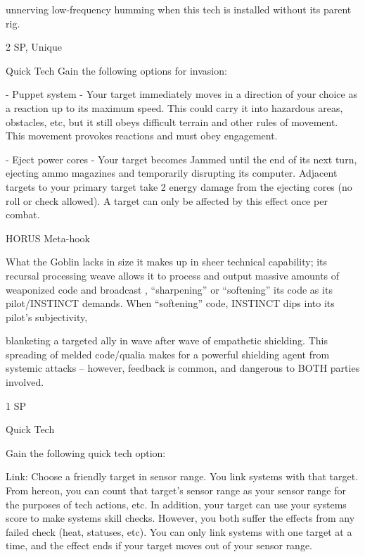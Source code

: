 unnerving low-frequency humming when this tech is installed without its parent rig.  

2 SP, Unique  

Quick Tech  
Gain the following options for invasion:
 
     -   Puppet system - Your target immediately moves in a direction of your choice as a  
         reaction up to its maximum speed. This could carry it into hazardous areas, obstacles,  
         etc, but it still obeys difficult terrain and other rules of movement. This movement  
         provokes reactions and must obey engagement.
 
     -   Eject power cores - Your target becomes Jammed until the end of its next turn, ejecting  
         ammo magazines and temporarily disrupting its computer. Adjacent targets to your  
         primary target take 2 energy damage from the ejecting cores (no roll or check allowed). A  
         target can only be affected by this effect once per combat.
 

HORUS Meta-hook  

                                                                                                                   


What the Goblin lacks in size it makes up in sheer technical capability; its recursal processing weave allows  
it to process and output massive amounts of weaponized code and broadcast , “sharpening” or “softening”  
its code as its pilot/INSTINCT demands. When “softening” code, INSTINCT dips into its pilot’s subjectivity,  

blanketing a targeted ally in wave after wave of empathetic shielding. This spreading of melded code/qualia  
makes for a powerful shielding agent from systemic attacks -- however, feedback is common, and  
dangerous to BOTH parties involved.   

1 SP
 
Quick Tech
 
Gain the following quick tech option:
 
         Link: Choose a friendly target in sensor range. You link systems with that target. From  
         hereon, you can count that target’s sensor range as your sensor range for the purposes of  
        tech actions, etc. In addition, your target can use your systems score to make systems  
        skill checks. However, you both suffer the effects from any failed check (heat, statuses,  
        etc). You can only link systems with one target at a time, and the effect ends if your target  
         moves out of your sensor range.
 

